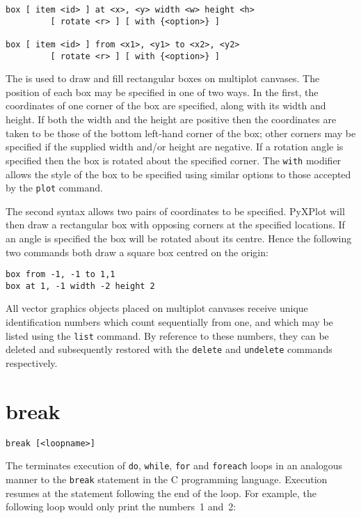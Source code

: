 \begin{verbatim}
box [ item <id> ] at <x>, <y> width <w> height <h>
         [ rotate <r> ] [ with {<option>} ]

box [ item <id> ] from <x1>, <y1> to <x2>, <y2>
         [ rotate <r> ] [ with {<option>} ]
\end{verbatim}

The  is used to draw and fill rectangular boxes on multiplot
canvases.  The position of each box may be specified in one of two ways.  In the
first, the coordinates of one corner of the box are specified, along with its
width and height. If both the width and the height are positive then the
coordinates are taken to be those of the bottom left-hand corner of the box;
other corners may be specified if the supplied width and/or height are
negative. If a rotation angle is specified then the box is rotated about the
specified corner.  The {\tt with} modifier allows the style of the box to be
specified using similar options to those accepted by the {\tt plot} command.

The second syntax allows two pairs of coordinates to be specified.  PyXPlot
will then draw a rectangular box with opposing corners at the specified
locations.  If an angle is specified the box will be rotated about its centre.
Hence the following two commands both draw a square box centred on the origin:

\begin{verbatim}
box from -1, -1 to 1,1
box at 1, -1 width -2 height 2
\end{verbatim}

All vector graphics objects placed on multiplot canvases receive unique
identification numbers which count sequentially from one, and which may be
listed using the {\tt list} command.  By reference to these numbers, they can
be deleted and subsequently restored with the {\tt delete} and {\tt undelete}
commands respectively.


\section{break}

\begin{verbatim}
break [<loopname>]
\end{verbatim}

The  terminates execution of {\tt do}, {\tt while}, {\tt for}
and {\tt foreach} loops in an analogous manner to the {\tt break} statement in
the C programming language.  Execution resumes at the statement following the
end of the loop. For example, the following loop would only print the numbers~1
and~2:

